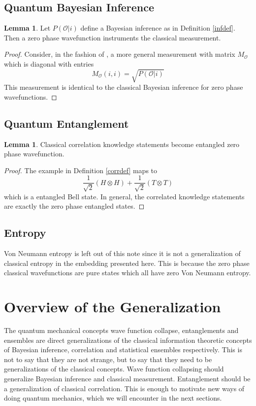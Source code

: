 \documentclass[12pt,a4paper]{article}
\theoremstyle{myrule}
\theoremstyle{postulate}
\theoremstyle{definition}
\newtheorem{lemma}[theorem]{Lemma}
\begin{document}
\subsection{Quantum Bayesian Inference}
\begin{lemma}
  Let $P(\mathcal{O} | i)$ define a Bayesian inference as in Definition \ref{infdef}.  Then a zero phase wavefunction instruments the classical measurement.
\end{lemma}
\begin{proof}
Consider, in the fashion of \cite{nielsenchuang}, a more general measurement with matrix $M_\mathcal{O}$ which is diagonal with entries
\[
   M_\mathcal{O}(i,i) = \sqrt{P(\mathcal{O} | i)}
\]
This measurement is identical to the classical Bayesian inference for zero phase wavefunctions.
\end{proof}

\subsection{Quantum Entanglement}
\begin{lemma}
  Classical correlation knowledge statements become entangled zero phase wavefunction.
\end{lemma}
\begin{proof}
  The example in Definition \ref{corrdef} maps to
  \[
  \frac{1}{\sqrt{2}} (H \otimes H) + \frac{1}{\sqrt{2}} (T \otimes T)
  \]
which is a entangled Bell state.  In general, the correlated knowledge statements are exactly the zero phase entangled states.
\end{proof}
\subsection{Entropy}
Von Neumann entropy is left out of this note since it is not a generalization of classical entropy in the embedding presented here.  This is because the zero phase classical wavefunctions are pure states which all have zero Von Neumann entropy.

\section{Overview of the Generalization}

The quantum mechanical concepts wave function collapse, entanglements and ensembles are direct generalizations of the classical information theoretic concepts of Bayesian inference, correlation and statistical ensembles respectively.  This is not to say that they are not strange, but to say that they need to be generalizations of the classical concepts.  Wave function collapsing should generalize Bayesian inference and classical measurement.  Entanglement should be a generalization of classical correlation.  This is enough to motivate new ways of doing quantum mechanics, which we will encounter in the next sections.
\end{document}

